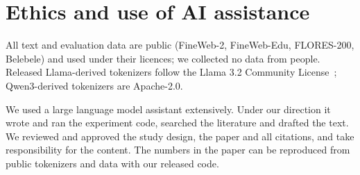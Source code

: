 \section*{Ethics and use of AI assistance}

All text and evaluation data are public (FineWeb-2, FineWeb-Edu, FLORES-200, Belebele) and used under their licences; we collected no data from people. Released Llama-derived tokenizers follow the Llama 3.2 Community License~\citep{llama32license}; Qwen3-derived tokenizers are Apache-2.0.

We used a large language model assistant extensively. Under our direction it wrote and ran the experiment code, searched the literature and drafted the text. We reviewed and approved the study design, the paper and all citations, and take responsibility for the content. The numbers in the paper can be reproduced from public tokenizers and data with our released code.
